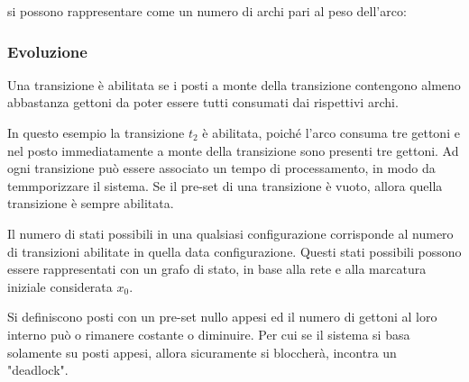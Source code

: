 \documentclass{article}
\numberwithin{equation}{subsection}
\begin{document}
si possono rappresentare come un numero di archi pari al peso dell'arco:
\begin{center}
\end{center}

\subsubsection{Evoluzione}

Una transizione è abilitata se i posti a monte della transizione contengono almeno abbastanza gettoni da poter essere tutti consumati dai rispettivi archi. 

\begin{center}
\end{center}

In questo esempio la transizione $t_2$ è abilitata, poiché l'arco consuma tre gettoni e nel posto immediatamente a monte della transizione sono presenti tre gettoni. 
Ad ogni transizione può essere associato un tempo di processamento, in modo da temmporizzare il sistema. Se il pre-set di una transizione è vuoto, allora quella transizione 
è sempre abilitata. 

Il numero di stati possibili in una qualsiasi configurazione corrisponde al numero di transizioni abilitate in quella data configurazione. Questi stati possibili possono 
essere rappresentati con un grafo di stato, in base alla rete e alla marcatura iniziale considerata $x_0$. 

Si definiscono posti con un pre-set nullo appesi ed il numero di gettoni al loro interno può o rimanere costante o diminuire. Per cui se il sistema si basa solamente su posti 
appesi, allora sicuramente si bloccherà, incontra un "deadlock". 
\end{document}
